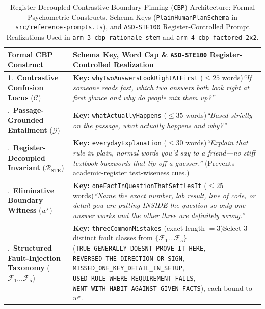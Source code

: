 \documentclass[11pt,a4paper]{article}
\begin{document}
\begin{table}[t]
\centering
\caption{Register-Decoupled Contrastive Boundary Pinning (\texttt{CBP}) Architecture: Formal Psychometric Constructs, Schema Keys (\texttt{PlainHumanPlanSchema} in \texttt{src/reference-prompts.ts}), and \texttt{ASD-STE100} Register-Controlled Prompt Realizations Used in \texttt{arm-3-cbp-rationale-stem} and \texttt{arm-4-cbp-factored-2x2}.}
\label{tab:cbp}
\small
\setlength{\tabcolsep}{5pt}
\begin{tabular}{@{}p{}p{}@{}}
\toprule
\textbf{Formal CBP Construct} & \textbf{Schema Key, Word Cap \& \texttt{ASD-STE100} Register-Controlled Realization} \\
\midrule
1.\ \textbf{Contrastive Confusion Locus} ($\mathcal{C}$) & \textbf{Key:} \texttt{whyTwoAnswersLookRightAtFirst} ($\le 25$ words)\newline \emph{``If someone reads fast, which two answers both look right at first glance and why do people mix them up?''} \cite{gierl2017developing} \\
\addlinespace[4pt]
2.\ \textbf{Passage-Grounded Entailment} ($\mathcal{G}$) & \textbf{Key:} \texttt{whatActuallyHappens} ($\le 35$ words)\newline \emph{``Based strictly on the passage, what actually happens and why?''} \\
\addlinespace[4pt]
3.\ \textbf{Register-Decoupled Invariant} ($\mathcal{R}_{\text{STE}}$) & \textbf{Key:} \texttt{everydayExplanation} ($\le 30$ words)\newline \emph{``Explain that rule in plain, normal words you'd say to a friend---no stiff textbook buzzwords that tip off a guesser.''} (Prevents academic-register test-wiseness cues.) \\
\addlinespace[4pt]
4.\ \textbf{Eliminative Boundary Witness} ($w^\star$) & \textbf{Key:} \texttt{oneFactInQuestionThatSettlesIt} ($\le 25$ words)\newline \emph{``Name the exact number, lab result, line of code, or detail you are putting INSIDE the question so only one answer works and the other three are definitely wrong.''} \cite{haladyna2002developing} \\
\addlinespace[4pt]
5.\ \textbf{Structured Fault-Injection Taxonomy} ($\mathcal{F}_1\dots\mathcal{F}_5$) & \textbf{Key:} \texttt{threeCommonMistakes} (exact length $= 3$)\newline Select 3 distinct fault classes from $\{\mathcal{F}_1\dots\mathcal{F}_5\}$ (\texttt{TRUE\_GENERALLY\_\allowbreak DOESNT\_PROVE\_IT\_HERE}, \texttt{REVERSED\_THE\_\allowbreak DIRECTION\_OR\_SIGN}, \texttt{MISSED\_ONE\_KEY\_\allowbreak DETAIL\_IN\_SETUP}, \texttt{USED\_RULE\_WHERE\_\allowbreak REQUIREMENT\_FAILS}, \texttt{WENT\_WITH\_HABIT\_\allowbreak AGAINST\_GIVEN\_FACTS}), each bound to $w^\star$. \\

\end{tabular}
\end{table}
\end{document}
